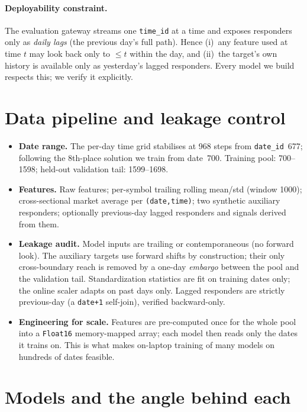 \documentclass[11pt]{article}
\begin{document}
\paragraph{Deployability constraint.}
The evaluation gateway streams one \texttt{time\_id} at a time and exposes
responders only as \emph{daily lags} (the previous day's full path). Hence
(i)~any feature used at time $t$ may look back only to $\le t$ within the day,
and (ii)~the target's own history is available only as yesterday's lagged
responders. Every model we build respects this; we verify it explicitly.

\section{Data pipeline and leakage control}

\begin{itemize}[leftmargin=1.2em,itemsep=1pt]
  \item \textbf{Date range.} The per-day time grid stabilises at 968 steps from
  \texttt{date\_id}~677; following the 8th-place solution we train from date~700.
  Training pool: 700--1598; held-out validation tail: 1599--1698.
  \item \textbf{Features.} Raw features; per-symbol trailing rolling mean/std
  (window 1000); cross-sectional market average per \texttt{(date,time)};
  two synthetic auxiliary responders; optionally previous-day lagged responders
  and signals derived from them.
  \item \textbf{Leakage audit.} Model inputs are trailing or contemporaneous
  (no forward look). The auxiliary targets use forward shifts by construction;
  their only cross-boundary reach is removed by a one-day \emph{embargo} between
  the pool and the validation tail. Standardization statistics are fit on
  training dates only; the online scaler adapts on past days only. Lagged
  responders are strictly previous-day (a \texttt{date+1} self-join), verified
  backward-only.
  \item \textbf{Engineering for scale.} Features are pre-computed once for the
  whole pool into a \texttt{Float16} memory-mapped array; each model then reads
  only the dates it trains on. This is what makes on-laptop training of many
  models on hundreds of dates feasible.
\end{itemize}

\section{Models and the angle behind each}
\end{document}
